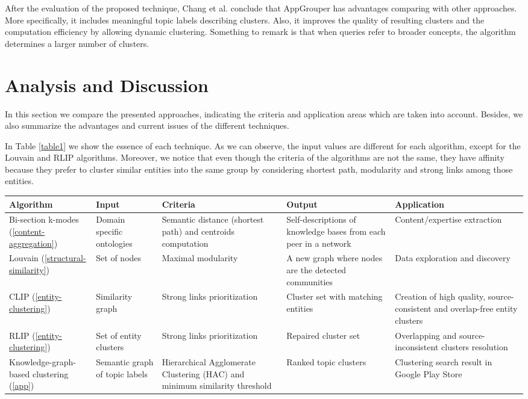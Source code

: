 \documentclass[runningheads]{llncs}
\begin{document}
After the evaluation of the proposed technique, Chang et al. \cite{Chang} conclude that AppGrouper has advantages comparing with other approaches. More specifically, it includes meaningful topic labels describing clusters. Also, it improves the quality of resulting clusters and the computation efficiency by allowing dynamic clustering. Something to remark is that when queries refer to broader concepts, the algorithm determines a larger number of clusters.

\section{Analysis and Discussion} \label{analysis}
In this section we compare the presented approaches, indicating the criteria and application areas which are taken into account. Besides, we also summarize the advantages and current issues of the different techniques.

In Table \ref{table1} we show the essence of each technique. As we can observe, the input values are different for each algorithm, except for the Louvain and RLIP algorithms. Moreover, we notice that even though the criteria of the algorithms are not the same, they have affinity because they prefer to cluster similar entities into the same group by considering shortest path, modularity and strong links among those entities.

 \label{table1}
\begin{tabular}{|p{2cm}|p{2.3cm}|p{3.5cm}|p{3.5cm}|p{3.5cm}|}
 \hline
\textbf{Algorithm} & \textbf{Input} & \textbf{Criteria} & \textbf{Output} & \textbf{Application}\\
 \hline
 Bi-section k-modes (\ref{content-aggregation}) & Domain specific ontologies & Semantic distance (shortest path) and centroids computation & Self-descriptions of knowledge bases from each peer in a network & Content/expertise extraction \\
 \hline
 Louvain (\ref{structural-similarity}) & Set of nodes & Maximal modularity & A new graph where nodes are the detected communities & Data exploration and discovery\\
 \hline
 CLIP (\ref{entity-clustering}) & Similarity graph & Strong links prioritization & Cluster set with matching entities & Creation of high quality, source-consistent and overlap-free entity clusters \\
 \hline
 RLIP (\ref{entity-clustering}) & Set of entity clusters & Strong links prioritization & Repaired cluster set & Overlapping and source-inconsistent clusters resolution \\
 \hline
 Knowledge-graph-based clustering (\ref{app}) & Semantic graph of topic labels & Hierarchical Agglomerate Clustering (HAC) and minimum similarity threshold & Ranked topic clusters & Clustering search result in Google Play Store \\
 \hline
\end{tabular}
\end{document}
